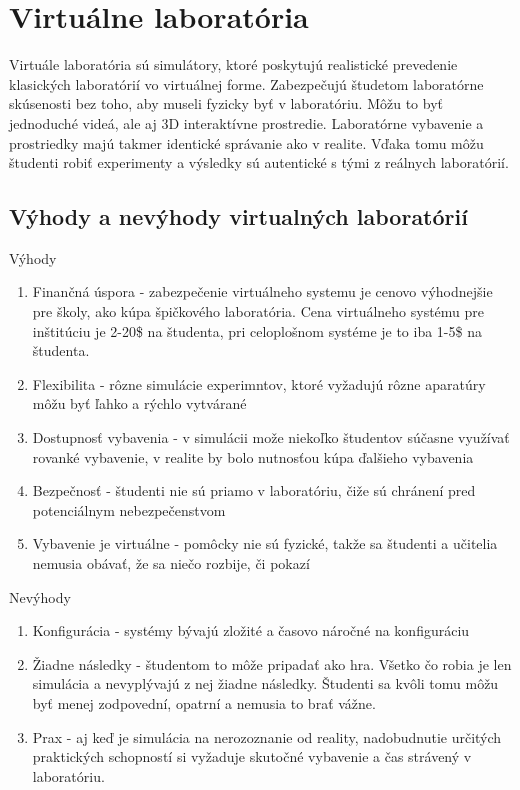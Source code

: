 \documentclass[10pt,twoside,slovak,a4paper]{article}
\begin{document}
\section {Virtuálne laboratória} \label{virtualne_laboratoria}
Virtuále laboratória sú simulátory, ktoré poskytujú realistické prevedenie klasických laboratórií vo virtuálnej forme. Zabezpečujú študetom laboratórne skúsenosti bez toho, aby museli fyzicky byť v laboratóriu. Môžu to byť jednoduché videá, ale aj 3D interaktívne prostredie. Laboratórne vybavenie a prostriedky majú takmer identické správanie ako v realite. Vďaka tomu môžu študenti robiť experimenty a výsledky sú autentické s tými z reálnych laboratórií.


\subsection {Výhody a nevýhody virtualných laboratórií} \label{vyhody_nevyhody}
 Výhody
\begin{enumerate}
\item Finančná úspora - zabezpečenie virtuálneho systemu je cenovo výhodnejšie pre školy, ako kúpa špičkového laboratória. Cena virtuálneho systému pre inštitúciu je 2-20\$ na študenta, pri celoplošnom systéme je to iba 1-5\$ na študenta.
\item Flexibilita - rôzne simulácie experimntov, ktoré vyžadujú rôzne aparatúry môžu byť ľahko a rýchlo vytvárané

\item Dostupnosť vybavenia - v simulácii može niekoľko študentov súčasne využívať rovanké vybavenie, v realite by bolo nutnosťou kúpa ďalšieho vybavenia

\item Bezpečnosť - študenti nie sú priamo v laboratóriu, čiže sú chránení pred potenciálnym nebezpečenstvom

\item Vybavenie je virtuálne - pomôcky nie sú fyzické, takže sa študenti a učitelia nemusia obávať, že sa niečo rozbije, či pokazí

\end{enumerate}
Nevýhody
\begin{enumerate}
    \item Konfigurácia - systémy bývajú zložité a časovo náročné na konfiguráciu
    \item Žiadne následky - študentom to môže pripadať ako hra. Všetko čo robia je len simulácia a nevyplývajú z nej žiadne následky. Študenti sa kvôli tomu môžu byť menej zodpovední, opatrní a nemusia to brať vážne.
    \item Prax - aj keď je simulácia na nerozoznanie od reality, nadobudnutie určitých praktických schopností si vyžaduje skutočné vybavenie a čas strávený v laboratóriu.
\end{enumerate}
\end{document}
